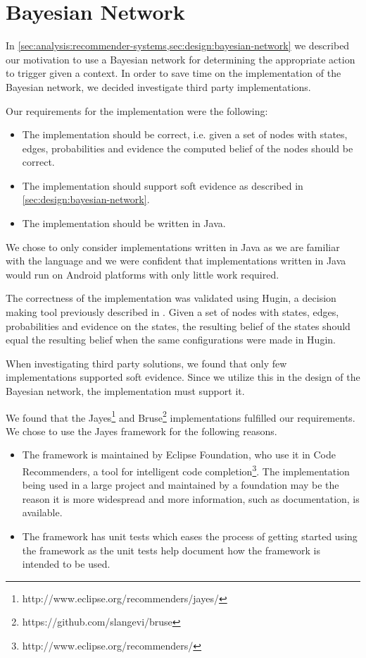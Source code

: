 \section{Bayesian Network}
\label{sec:implementation:bayesian-network}

In \cref{sec:analysis:recommender-systems,sec:design:bayesian-network} we described our motivation to use a Bayesian network for determining the appropriate action to trigger given a context. In order to save time on the implementation of the Bayesian network, we decided investigate third party implementations.

Our requirements for the implementation were the following:

\begin{itemize}
\item The implementation should be correct, i.e. given a set of nodes with states, edges, probabilities and evidence the computed belief of the nodes should be correct.
\item The implementation should support soft evidence as described in \cref{sec:design:bayesian-network}.
\item The implementation should be written in Java.
\end{itemize}

We chose to only consider implementations written in Java as we are familiar with the language and we were confident that implementations written in Java would run on Android platforms with only little work required. 

The correctness of the implementation was validated using Hugin, a decision making tool previously described in . Given a set of nodes with states, edges, probabilities and evidence on the states, the resulting belief of the states should equal the resulting belief when the same configurations were made in Hugin.

When investigating third party solutions, we found that only few implementations supported soft evidence. Since we utilize this in the design of the Bayesian network, the implementation must support it. 

We found that the Jayes\footnote{http://www.eclipse.org/recommenders/jayes/} and Bruse\footnote{https://github.com/slangevi/bruse} implementations fulfilled our requirements. We chose to use the Jayes framework for the following reasons.

\begin{itemize}
\item The framework is maintained by Eclipse Foundation, who use it in Code Recommenders, a tool for intelligent code completion\footnote{http://www.eclipse.org/recommenders/}. The implementation being used in a large project and maintained by a foundation may be the reason it is more widespread and more information, such as documentation, is available.
\item The framework  has unit tests which eases the process of getting started using the framework as the unit tests help document how the framework is intended to be used.
\end{itemize}

